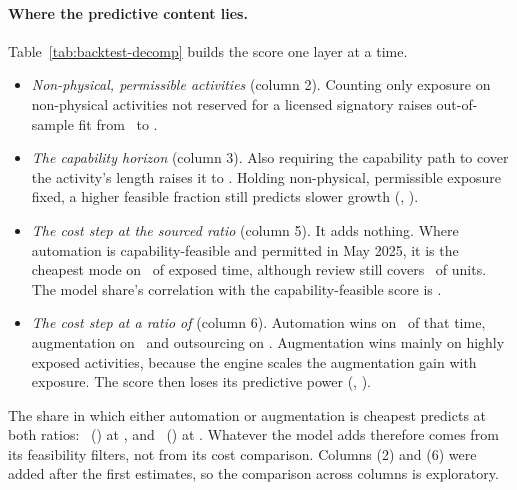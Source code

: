 \paragraph{Where the predictive content lies.} Table~\ref{tab:backtest-decomp} builds the score one layer at a time.
\begin{itemize}
\item \emph{Non-physical, permissible activities} (column 2). Counting only exposure on non-physical activities not reserved for a licensed signatory raises out-of-sample fit from \btCvE\ to \btCvEnp.
\item \emph{The capability horizon} (column 3). Also requiring the capability path to cover the activity's length raises it to \btCvFeas. Holding non-physical, permissible exposure fixed, a higher feasible fraction still predicts slower growth (\btTimingB, \btTimingSe).
\item \emph{The cost step at the sourced ratio} (column 5). It adds nothing. Where automation is capability-feasible and permitted in May 2025, it is the cheapest mode on \btShareA\ of exposed time, although review still covers \btReviewShare\ of units. The model share's correlation with the capability-feasible score is \btCorrMFeas.
\item \emph{The cost step at a ratio of \btRhoOld} (column 6). Automation wins on \btShareAOld\ of that time, augmentation on \btShareUOld\ and outsourcing on \btShareOOld. Augmentation wins mainly on highly exposed activities, because the engine scales the augmentation gain with exposure. The score then loses its predictive power (\btMOldB, \btMOldSe).
\end{itemize}
The share in which either automation or augmentation is cheapest predicts at both ratios: \btAUB\ (\btAUSe) at \btRhoRev, and \btAUOldB\ (\btAUOldSe) at \btRhoOld. Whatever the model adds therefore comes from its feasibility filters, not from its cost comparison. Columns (2) and (6) were added after the first estimates, so the comparison across columns is exploratory.




